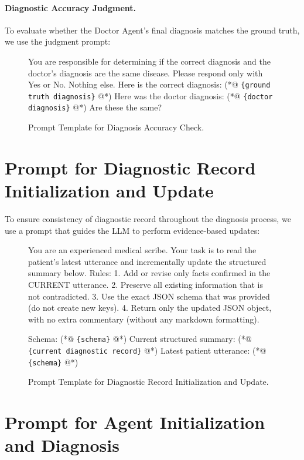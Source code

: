 \documentclass[11pt]{article}
\newcommand{\placeholder}[1]{%
	\colorbox{blue!10}{\texttt{\color{blue!80!black}\{#1\}}}%
}
\begin{document}
\paragraph{Diagnostic Accuracy Judgment.}
To evaluate whether the Doctor Agent’s final diagnosis matches the ground truth, we use the judgment prompt:

\begin{figure}[H]
	\caption{Prompt Template for Diagnosis Accuracy Check.}
	\begin{promptlisting}
		You are responsible for determining if the correct diagnosis and the doctor's diagnosis are the same disease. Please respond only with Yes or No. Nothing else.
		Here is the correct diagnosis: (*@\placeholder{ground truth diagnosis}@*)
		Here was the doctor diagnosis: (*@\placeholder{doctor diagnosis}@*)
		Are these the same?
	\end{promptlisting}
	\label{prompt3}
\end{figure}

\section{Prompt for Diagnostic Record Initialization and Update}

To ensure consistency of diagnostic record throughout the diagnosis process, we use a prompt that guides the LLM to perform evidence-based updates:

\begin{figure}[htbp]
	\caption{Prompt Template for Diagnostic Record Initialization and Update.}
	\begin{promptlisting}
		You are an experienced medical scribe.  
		Your task is to read the patient's latest utterance and incrementally update the structured summary below.
		Rules:
		1. Add or revise only facts confirmed in the CURRENT utterance.
		2. Preserve all existing information that is not contradicted.
		3. Use the exact JSON schema that was provided (do not create new keys).
		4. Return only the updated JSON object, with no extra commentary (without any markdown formatting).
		
		Schema: (*@\placeholder{schema}@*)
		Current structured summary: (*@\placeholder{current diagnostic record}@*)
		Latest patient utterance: (*@\placeholder{schema}@*)
		
		
	\end{promptlisting}
	\label{prompt4}
\end{figure}

\section{Prompt for Agent Initialization and Diagnosis}
\label{appendix6}
\end{document}
